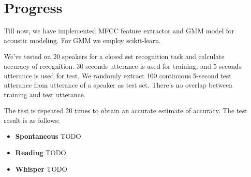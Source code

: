 
\section{Progress}
	Till now, we have implemented MFCC feature extractor and GMM model for
	acoustic modeling. For GMM we employ scikit-learn\cite{scikit-learn}.

	We've tested on 20 speakers for a closed set recognition task and calculate
	accuracy of recognition. 30 seconds utterance is used for training, and 5
	seconds utterance is used for test. We randomly extract 100 continuous 5-second
	test utterance from utterance of a speaker as test set.
	There's no overlap between training and test utterance.

	The test is repeated 20 times to obtain an accurate estimate of accuracy.
	The test result is as follows:

	\begin{itemize}
		\item \textbf{Spontaneous} TODO
		\item \textbf{Reading} TODO
		\item \textbf{Whisper} TODO
	\end{itemize}
